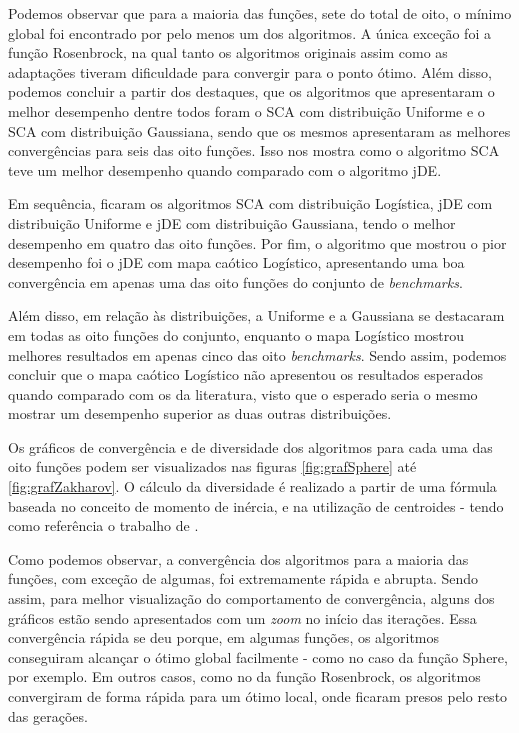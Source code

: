 
Podemos observar que para a maioria das funções, sete do total de oito, o mínimo global foi encontrado por pelo menos um dos algoritmos. A única exceção foi a função Rosenbrock, na qual tanto os algoritmos originais assim como as adaptações tiveram dificuldade para convergir para o ponto ótimo. Além disso, podemos concluir a partir dos destaques, que os algoritmos que apresentaram o melhor desempenho dentre todos foram o SCA com distribuição Uniforme e o SCA com distribuição Gaussiana, sendo que os mesmos apresentaram as melhores convergências para seis das oito funções. Isso nos mostra como o algoritmo SCA teve um melhor desempenho quando comparado com o algoritmo jDE.

Em sequência, ficaram os algoritmos SCA com distribuição Logística, jDE com distribuição Uniforme e jDE com distribuição Gaussiana, tendo o melhor desempenho em quatro das oito funções. Por fim, o algoritmo que mostrou o pior desempenho foi o jDE com mapa caótico Logístico, apresentando uma boa convergência em apenas uma das oito funções do conjunto de \textit{benchmarks}. 

Além disso, em relação às distribuições, a Uniforme e a Gaussiana se destacaram em todas as oito funções do conjunto, enquanto o mapa Logístico mostrou melhores resultados em apenas cinco das oito \textit{benchmarks}. Sendo assim, podemos concluir que o mapa caótico Logístico não apresentou os resultados esperados quando comparado com os da literatura, visto que o esperado seria o mesmo mostrar um desempenho superior as duas outras distribuições.


Os gráficos de convergência e de diversidade dos algoritmos para cada uma das oito funções podem ser visualizados nas figuras \ref{fig:grafSphere} até  %
\ref{fig:grafZakharov}. O cálculo da diversidade é realizado a partir de uma fórmula baseada no conceito de momento de inércia, e na utilização de centroides - tendo como referência o trabalho de \cite{morrison}.

Como podemos observar, a convergência dos algoritmos para a maioria das funções, com exceção de algumas, foi extremamente rápida e abrupta. Sendo assim, para melhor visualização do comportamento de convergência, alguns dos gráficos estão sendo apresentados com um \textit{zoom} no início das iterações. Essa convergência rápida se deu porque, em algumas funções, os algoritmos conseguiram alcançar o ótimo global facilmente - como no caso da função Sphere, por exemplo. Em outros casos, como no da função Rosenbrock, os algoritmos convergiram de forma rápida para um ótimo local, onde ficaram presos pelo resto das gerações.


